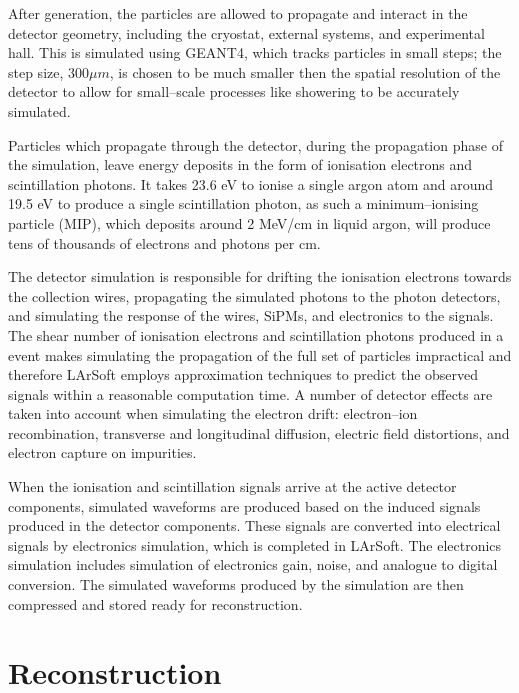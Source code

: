 After generation, the particles are allowed to propagate and interact in the 
detector geometry, including the cryostat, external systems, and experimental
hall. This is simulated using GEANT4\cite{Agostinelli:2002hh}, which tracks 
particles in small steps; the step size, $300 \mu m$, is chosen to be much 
smaller then the spatial resolution of the detector to allow for small--scale 
processes like showering to be accurately simulated. 

Particles which propagate through the detector, during the propagation phase of
the simulation, leave energy deposits in the form of ionisation electrons and
scintillation photons. It takes 23.6 eV to ionise a single argon atom and 
around 19.5 eV to produce a single scintillation photon, as such a 
minimum--ionising particle (MIP), which deposits around 2 MeV/cm
in liquid argon, will produce tens of thousands of electrons and photons per cm.

The detector simulation is responsible for drifting the ionisation electrons 
towards the collection wires, propagating the simulated photons to the photon 
detectors, and simulating the response of the wires, SiPMs, and electronics to 
the signals. The shear number of ionisation electrons and scintillation 
photons produced in a \protodune{} event makes simulating the propagation of 
the full set of particles impractical and therefore LArSoft employs 
approximation techniques to predict the observed signals within a reasonable 
computation time. A number of detector effects are taken into account when 
simulating the electron drift: electron--ion recombination, transverse and 
longitudinal diffusion, electric field distortions, and electron capture on 
impurities. 

When the ionisation and scintillation signals arrive at the active detector 
components, simulated waveforms are produced based on the induced signals 
produced in the detector components. These signals are converted into 
electrical signals by electronics simulation, which is completed in LArSoft. 
The electronics simulation includes simulation of electronics gain, noise, 
and analogue to digital conversion. The simulated waveforms produced by the 
\protodune{} simulation are then compressed and stored ready for reconstruction.

\section{Reconstruction} \label{sec:reconstruction}

